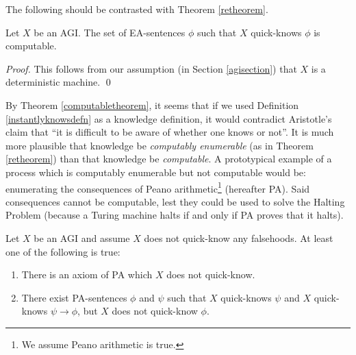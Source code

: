 \documentclass[runningheads]{llncs}
\begin{document}
The following should be contrasted with Theorem \ref{retheorem}.

\begin{theorem}
\label{computabletheorem}
  Let $X$ be an AGI.
  The set of EA-sentences $\phi$ such that $X$ quick-knows $\phi$ is computable.
\end{theorem}

\begin{proof}
  This follows from our assumption (in Section \ref{agisection}) that
  $X$ is a deterministic machine.
  \qed
\end{proof}

By Theorem \ref{computabletheorem}, it seems that if we used
Definition \ref{instantlyknowsdefn} as a knowledge definition, it would
contradict Aristotle's claim that
``it is difficult to be aware of whether one
knows or not''. It is much more plausible that knowledge be \emph{computably enumerable}
(as in Theorem \ref{retheorem}) than that knowledge be \emph{computable}.
A prototypical example of a process which is computably enumerable but not computable
would be: enumerating the consequences of Peano arithmetic\footnote{We assume Peano
arithmetic is true.} (hereafter PA).
Said consequences cannot be computable, lest they could be used to solve the Halting
Problem (because a Turing machine halts if and only if PA proves that it halts).

\begin{theorem}
\label{badnesstheorem}
Let $X$ be an AGI and assume $X$ does not quick-know any falsehoods.
At least one of the following is true:
\begin{enumerate}
  \item There is an axiom of PA which $X$ does not quick-know.
  \item There exist PA-sentences $\phi$ and $\psi$
  such that $X$ quick-knows $\psi$ and $X$ quick-knows $\psi\rightarrow\phi$,
  but $X$ does not quick-know $\phi$.
\end{enumerate}
\end{theorem}
\end{document}
